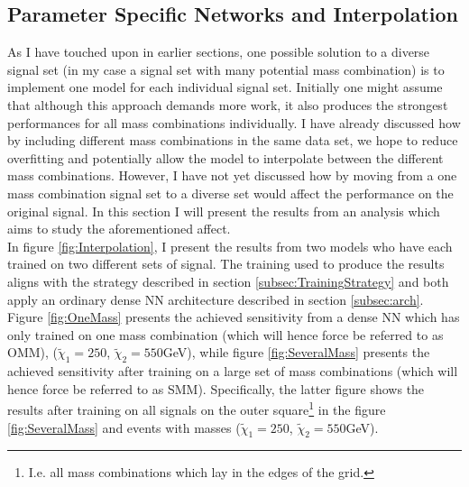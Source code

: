 \subsection{Parameter Specific Networks and Interpolation}
As I have touched upon in earlier sections, one possible solution to a diverse signal set (in my case a signal set with many 
potential mass combination) is to implement one model for each individual signal set. Initially one might assume that although 
this approach demands more work, it also produces the strongest performances for all mass combinations individually. I have already 
discussed how by including different mass combinations in the same data set, we hope to reduce overfitting and potentially allow 
the model to interpolate between the different mass combinations. However, I have not yet discussed how by moving from a one 
mass combination signal set to a diverse set would affect the performance on the original signal. In this section I will present the 
results from an analysis which aims to study the aforementioned affect.
\\
In figure \ref{fig:Interpolation}, I present the results from two models who have each trained on two different sets of signal.
The training used to produce the results aligns with the strategy described in section \ref{subsec:TrainingStrategy} and both apply
an ordinary dense \ac{NN} architecture described in section \ref{subsec:arch}.
Figure \ref{fig:OneMass} presents the achieved sensitivity from a dense \ac{NN} which has only trained on one mass combination (which will 
hence force be referred to as \ac{OMM}), ($\tilde{\chi}_1=250$, $\tilde{\chi}_2=550$GeV), while figure \ref{fig:SeveralMass} presents the 
achieved sensitivity after training on a large set of mass combinations (which will hence force be referred 
to as \ac{SMM}). Specifically, the latter figure shows the results after training on all signals on the outer square\footnote{I.e. all mass combinations 
which lay in the edges of the grid.} in the figure \ref{fig:SeveralMass} and events with masses ($\tilde{\chi}_1=250$, $\tilde{\chi}_2=550$GeV).\\
